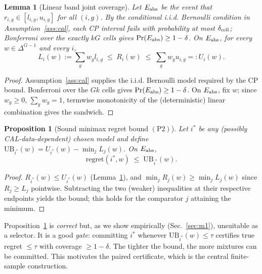 \documentclass{article}
\newtheorem{lemma}{Lemma}
\newtheorem{proposition}{Proposition}
\begin{document}
\begin{lemma}[Linear band joint coverage]
\label{lem:band}
Let $E_{\rm abs}$ be the event that $r_{i,g}\in[l_{i,g},u_{i,g}]$ for all $(i,g)$. By
the conditional i.i.d. Bernoulli condition in Assumption~\ref{ass:cal}, each CP interval
fails with probability at most $\delta_{\rm cell}$; Bonferroni over the exactly $kG$ cells gives
$\Pr(E_{\rm abs})\ge 1-\delta$. On $E_{\rm abs}$, for every $w\in\Delta^{G-1}$ and every $i$,
\[
  L_i(w):=\sum_g w_g l_{i,g}\;\le\; R_i(w)\;\le\;
  \sum_g w_g u_{i,g}=:U_i(w).
\]
\end{lemma}
\begin{proof}
Assumption~\ref{ass:cal} supplies the i.i.d. Bernoulli model required by the CP bound.
Bonferroni over the $G k$ cells gives $\Pr(E_{\rm abs})\ge1-\delta$. On $E_{\rm abs}$, fix $w$;
since $w_g\ge0$, $\sum_g w_g=1$, termwise monotonicity
of the (deterministic) linear combination gives the sandwich.
\end{proof}

\begin{proposition}[Sound minimax regret bound $(\mathrm{P2})$]
\label{prop:p2}
Let $i^*$ be any (possibly CAL-data-dependent) chosen model and define
$\mathrm{UB}_{i^*}(w)=U_{i^*}(w)-\min_j L_j(w)$. On $E_{\rm abs}$,
\[
  \mathrm{regret}(i^*,w)\;\le\;\mathrm{UB}_{i^*}(w).
\]
\end{proposition}
\begin{proof}
$R_{i^*}(w)\le U_{i^*}(w)$ (Lemma~\ref{lem:band}), and
$\min_j R_j(w)\ge \min_j L_j(w)$ since $R_j\ge L_j$ pointwise. Subtracting the two
(weaker) inequalities at their respective endpoints yields the bound; this holds for the
comparator $j$ attaining the minimum.
\end{proof}

Proposition~\ref{prop:p2} is \emph{correct} but, as we show empirically
(Sec.~\ref{sec:m1}), unsuitable as a selector. It is a good \emph{gate}: committing $i^*$
whenever $\mathrm{UB}_{i^*}(w)\le\tau$ certifies true regret $\le\tau$ with coverage
$\ge1-\delta$. The tighter the bound, the more mixtures can be committed. This motivates the
paired certificate, which is the central finite-sample construction.
\end{document}
